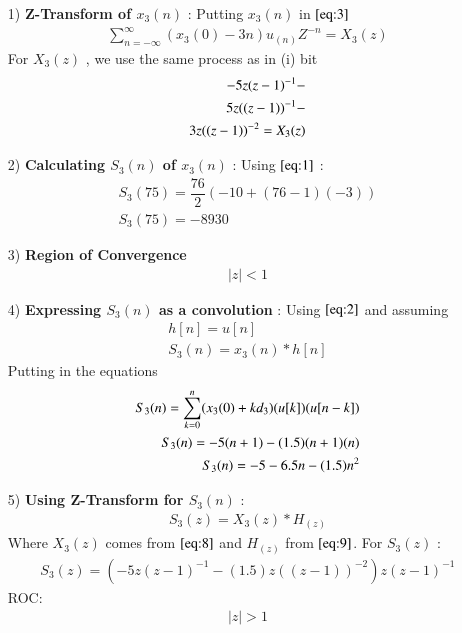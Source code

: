 \documentclass[journal,12pt,twocolumn]{IEEEtran}
\theoremstyle{remark}
\begin{document}
\begin{enumerate}
\item[1)] 
\textbf{Z-Transform of $x_3(n)$} :
Putting $x_3(n)$ in $\eqref{eq:3}$
\vspace{0.05cm}
\begin{align}
\sum_{n=-\infty}^{\infty}(x_3(0) -3n)u_{(n)}Z^{-n} =X_3(z)
\end{align}
For $X_3(z)$ , we use the same process as in (i) bit\vspace{0.05cm}
\begin{align}
  \notag -5z(z-1)^{-1}-\\
\notag 5z((z-1))^{-1}-\\
       3z((z-1))^{-2}=X_3(z) \label{eq:8}
\end{align}
\item[2)]
\textbf{Calculating $S_3(n)$ of $x_3(n)$} :
Using $\eqref{eq:1}$ :\vspace{0.05cm}
\begin{align}
    S_3(75)=\dfrac{76}{2}(-10+(76-1)(-3))\\
   S_3(75)=-8930
    \end{align}
     \item[3)]
 \textbf{Region of Convergence}
\vspace{0.05cm}
\begin{align}
    \lvert z\rvert  <  1 
    \end{align}


\vspace{0.05cm}
    \vspace{0.7cm}
\item[4)]
\textbf{Expressing $S_3(n)$ as a convolution} :
Using $\eqref{eq:2}$ and assuming 
\begin{align}
         h[n]=u[n] \\
    S_3(n) = x_3(n) * h[n] 
\end{align}
Putting in the equations
\begin{align}
     S_3(n) = \sum_{k=0}^{n}(x_3(0) + kd_3)
 \notag    (u[k])(u[n-k])   \\
 S_3(n) = -5(n+1) -(1.5)(n+1)(n)  \\
  S_3(n) = -5 - 6.5n - (1.5)n^2
\end{align}
\item[5)]
\textbf{Using Z-Transform for $S_3(n)$} :
\begin{align}
    S_3(z) = X_3(z) * H_(z)
    \end{align}
    Where $X_3(z)$ comes from $\eqref{eq:8}$ and $H_(z)$ from $\eqref{eq:9}$.
    \vspace{0.05cm}
    For $S_3(z)$ :
    \begin{align}
            S_3(z) = (-5z(z-1)^{-1}-
       (1.5)z((z-1))^{-2})z(z-1)^{-1}
    \end{align}
    ROC:
    \begin{align} 
    \lvert z \rvert > 1
    \end{align}
    

\end{enumerate}
\end{document}
